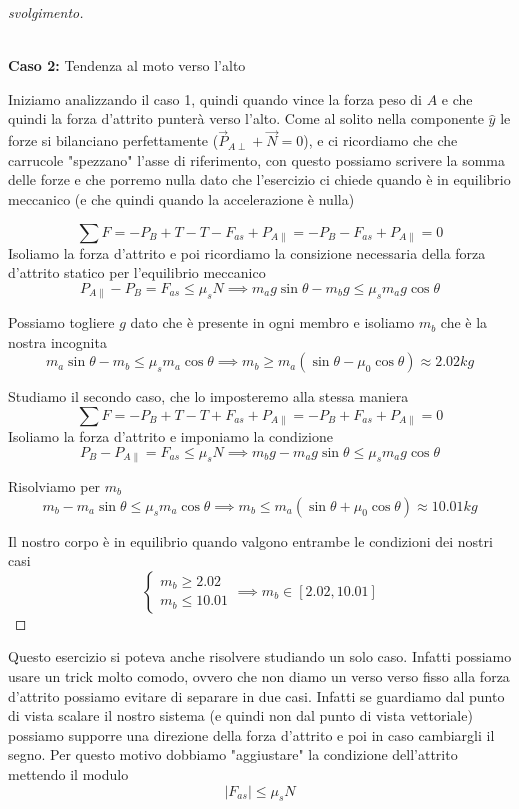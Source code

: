 \documentclass{rapport}
\begin{document}
\begin{proof}[svolgimento]
\begin{center}
\begin{minipage}{0.48\textwidth}
{\begin{tikzpicture}[>=Stealth, thick]
        \end{tikzpicture}
        }
        \\[0.3cm]
        \textbf{Caso 2:} Tendenza al moto verso l'alto 
    \end{minipage}
\end{center}

Iniziamo analizzando il caso 1, quindi quando vince la forza peso di $A$ e che quindi la forza d'attrito punterà verso l'alto. Come al solito nella componente $\hat{y}$  le forze si bilanciano perfettamente ($\vec{P}_{A\perp} + \vec{N} = 0$), e ci ricordiamo che che carrucole "spezzano" l'asse di riferimento, con questo possiamo scrivere la somma delle forze e che porremo nulla dato che l'esercizio ci chiede quando è in equilibrio meccanico (e che quindi quando la accelerazione è nulla)

\[
\sum F = -P_{B} + T - T - F_{as} + P_{A\parallel} = -P_{B}  - F_{as} + P_{A\parallel} = 0 
\]
 Isoliamo la forza d'attrito e poi ricordiamo la consizione necessaria della forza d'attrito statico per l'equilibrio meccanico 
 \[
  P_{A\parallel} -P_{B}   = F_{as} \leq \mu_s N \implies m_ag\sin\theta - m_bg \leq \mu_s m_ag\cos\theta
 \]

 Possiamo togliere $g$ dato che è presente in ogni membro e isoliamo $m_b$ che è la nostra incognita
 \[
 m_a\sin\theta - m_b \leq \mu_s m_a\cos\theta \implies m_b \geq m_a(\sin\theta -\mu_0\cos\theta) \approx 2.02kg
 \]

 Studiamo il secondo caso, che lo imposteremo alla stessa maniera
 \[
 \sum F = -P_{B} + T - T + F_{as} + P_{A\parallel} = -P_{B}  + F_{as} + P_{A\parallel} = 0 
 \]
Isoliamo la forza d'attrito e imponiamo la condizione 
\[
P_{B} - P_{A\parallel}   = F_{as} \leq \mu_s N \implies  m_bg  -m_ag\sin\theta \leq \mu_s m_ag\cos\theta
\]

Risolviamo per $m_b$ 
 \[
 m_b  -m_a\sin\theta  \leq \mu_s m_a\cos\theta \implies m_b \leq m_a(\sin\theta +\mu_0\cos\theta) \approx 10.01kg
 \]

 Il nostro corpo è in equilibrio quando valgono entrambe le condizioni dei nostri casi 
 \[
 \begin{cases}
  m_b \geq 2.02 \\
  m_b \leq 10.01
 \end{cases} \implies m_b \in [2.02, 10.01]
 \]
\end{proof}

Questo esercizio si poteva anche risolvere studiando un solo caso. Infatti possiamo usare un trick molto comodo, ovvero che non diamo un verso verso fisso alla forza d'attrito possiamo evitare di separare in due casi. Infatti se guardiamo dal punto di vista scalare il nostro sistema (e quindi non dal punto di vista vettoriale) possiamo supporre una direzione della forza d'attrito e poi in caso cambiargli il segno. Per questo motivo dobbiamo "aggiustare" la condizione dell'attrito mettendo il modulo 
\[
|F_{as}| \leq \mu_s N
\]
\end{document}

